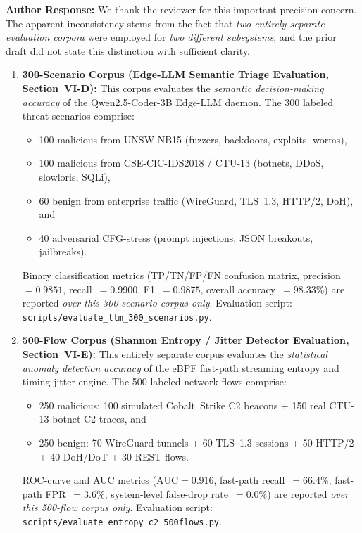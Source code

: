 \documentclass[10pt,letterpaper]{article}
\begin{document}
\begin{authorbox}
\textbf{Author Response:}
We thank the reviewer for this important precision concern. The apparent
inconsistency stems from the fact that \emph{two entirely separate evaluation
corpora} were employed for \emph{two different subsystems}, and the prior draft
did not state this distinction with sufficient clarity.
\begin{enumerate}[leftmargin=*]
  \item \textbf{300-Scenario Corpus (Edge-LLM Semantic Triage Evaluation,
    Section~VI-D):}
    This corpus evaluates the \emph{semantic decision-making accuracy} of the
    Qwen2.5-Coder-3B Edge-LLM daemon. The 300 labeled threat scenarios
    comprise:
    \begin{itemize}
      \item 100 malicious from UNSW-NB15 (fuzzers, backdoors, exploits, worms),
      \item 100 malicious from CSE-CIC-IDS2018 / CTU-13 (botnets, DDoS, slowloris, SQLi),
      \item 60 benign from enterprise traffic (WireGuard, TLS~1.3, HTTP/2, DoH), and
      \item 40 adversarial CFG-stress (prompt injections, JSON breakouts, jailbreaks).
    \end{itemize}
    Binary classification metrics (TP/TN/FP/FN confusion matrix,
    precision~$= 0.9851$, recall~$= 0.9900$, F1~$= 0.9875$, overall accuracy~$= 98.33\%$)
    are reported \emph{over this 300-scenario corpus only}.
    Evaluation script: \texttt{scripts/evaluate\_llm\_300\_scenarios.py}.

  \item \textbf{500-Flow Corpus (Shannon Entropy / Jitter Detector Evaluation,
    Section~VI-E):}
    This entirely separate corpus evaluates the \emph{statistical anomaly
    detection accuracy} of the eBPF fast-path streaming entropy and timing
    jitter engine. The 500 labeled network flows comprise:
    \begin{itemize}
      \item 250 malicious: 100 simulated Cobalt~Strike C2 beacons + 150 real
        CTU-13 botnet C2 traces, and
      \item 250 benign: 70 WireGuard tunnels + 60 TLS~1.3 sessions + 50 HTTP/2
        + 40 DoH/DoT + 30 REST flows.
    \end{itemize}
    ROC-curve and AUC metrics
    ($\mathrm{AUC}{=}0.916$, fast-path recall~$= 66.4\%$,
    fast-path FPR~$= 3.6\%$, system-level false-drop rate~$= 0.0\%$)
    are reported \emph{over this 500-flow corpus only}.
    Evaluation script: \texttt{scripts/evaluate\_entropy\_c2\_500flows.py}.
\end{enumerate}


\end{authorbox}
\end{document}
